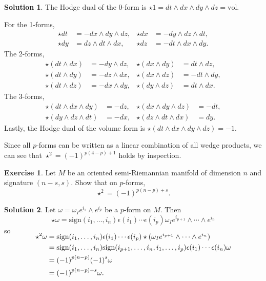 \documentclass[11pt, a4paper]{report}
\theoremstyle{definition}
\newtheorem{ex}{Exercise}[part]
\newtheorem{sol}{Solution}[part]
\begin{document}
\begin{sol}

The Hodge dual of the 0-form is $\star 1 = dt \wedge dx \wedge dy \wedge dz = \text{vol}$.

For the 1-forms,
\begin{align*}
    \star dt &= - dx \wedge dy \wedge dz, &
    \star dx &= - dy \wedge dz \wedge dt, \\
    \star dy &= dz \wedge dt \wedge dx, &
    \star dz &= - dt \wedge dx \wedge dy.
\end{align*}
The 2-forms,
\begin{align*}
    \star (dt \wedge dx) &= - dy \wedge dz, &
    \star (dx \wedge dy) &= dt \wedge dz, \\
    \star (dt \wedge dy) &= - dz \wedge dx, &
    \star (dx \wedge dz) &= - dt \wedge dy, \\
    \star (dt \wedge dz) &= - dx \wedge dy, &
    \star (dy \wedge dz) &= dt \wedge dx.
\end{align*}
The 3-forms,
\begin{align*}
    \star(dt \wedge dx \wedge dy) &= - dz, &
    \star(dx \wedge dy \wedge dz) &= - dt, \\
    \star(dy \wedge dz \wedge dt) &= - dx, &
    \star(dz \wedge dt \wedge dx) &= dy.
\end{align*}
Lastly, the Hodge dual of the volume form is $\star (dt \wedge dx \wedge dy \wedge dz) = -1$.

Since all $p$-forms can be written as a linear combination of all wedge products, we can see that $\star^2 = {(-1)}^{p (4 - p) + 1}$ holds by inspection.

\end{sol}

\begin{ex}

Let $M$ be an oriented semi-Riemannian manifold of dimension $n$ and signature $(n-s, s)$. Show that on $p$-forms,
\[
    \star^2 = {(-1)}^{p (n - p) + s}.
\]

\end{ex}

\begin{sol}

Let $\omega = \omega_I e^{i_1} \wedge e^{i_p}$ be a $p$-form on $M$. Then
\[
    \star \omega = \text{sign}(i_1, \ldots, i_n) \epsilon(i_1) \cdots \epsilon(i_p) \omega_I e^{i_{p + 1}} \wedge \cdots \wedge e^{i_n}
\]
so
\begin{align*}
    \SwapAboveDisplaySkip
    \star^2 \omega &= \text{sign}(i_1, \ldots, i_n) \epsilon(i_1) \cdots \epsilon(i_p) \star (\omega_I e^{i_{p + 1}} \wedge \cdots \wedge e^{i_n}) \\
        &= \text{sign}(i_1, \ldots, i_n) \text{sign}(i_{p + 1}, \ldots, i_n, i_1, \ldots, i_p) \epsilon(i_1) \cdots \epsilon(i_n) \omega \\
        &= {(-1)}^{p (n - p)} {(-1)}^s \omega \\
        &= {(-1)}^{p (n - p) + s} \omega.
\end{align*}

\end{sol}
\end{document}
